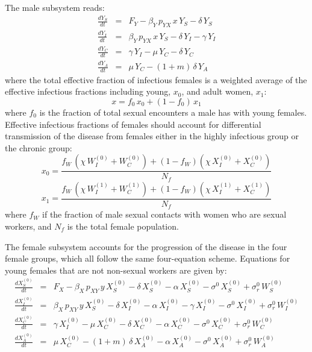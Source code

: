 \documentclass[preprint,12pt]{elsarticle}
\begin{document}
The male subsystem reads:
\begin{eqnarray}
\frac{dY_S}{dt} & = & F_Y - \beta_Y\,p_{YX}\,x\, Y_S - \delta\,Y_S \nonumber\\
\frac{dY_I}{dt} & = & \beta_Y\,p_{YX}\,x\, Y_S - \delta\,Y_I -\gamma\,Y_I \nonumber\\
\frac{dY_C}{dt} & = & \gamma\,Y_I - \mu\, Y_C  - \delta\,Y_C \nonumber\\
\frac{dY_A}{dt} & = & \mu\, Y_C - (1+m)\,\delta\, Y_A
\label{eq:Y}
\end{eqnarray}
where the total effective fraction of infectious females is a weighted average of the effective infectious fractions including young, $x_0$, and adult women, $x_1$:
\begin{equation}
x = f_0\, x_0 + (1-f_0)\,x_1
\label{eq:x_fraction}
\end{equation}
where $f_0$ is the fraction of total sexual encounters a male has with young females. Effective infectious fractions of females should account for differential transmission of the disease from females either in the highly infectious group or the chronic group:
\begin{equation}
x_0 = \frac{ f_W\,(\chi\,W^{(0)}_I+W^{(0)}_C) + (1-f_W)(\chi\,X^{(0)}_I+X^{(0)}_C) }{N_f}
\label{eq:x0_fraction}
\end{equation}
\begin{equation}
x_1 = \frac{ f_W\,(\chi\,W^{(1)}_I+W^{(1)}_C) + (1-f_W)(\chi\,X^{(1)}_I+X^{(1)}_C) }{N_f}
\label{eq:x1_fraction}    
\end{equation}
where $f_W$ if the fraction of male sexual contacts with women who are sexual workers, and $N_f$ is the total female population. 
\smallskip

The female subsystem accounts for the progression of the disease in the four female groups, which all follow the same four-equation scheme. Equations for young females that are not non-sexual workers are given by:
\begin{eqnarray}
\frac{dX^{(0)}_S}{dt} & = & F_X - \beta_X\,p_{XY}\,y\, X^{(0)}_S - \delta\,X^{(0)}_S -\alpha \, X^{(0)}_S - \sigma^0\,X^{(0)}_S + \sigma^0_r\,W^{(0)}_S\nonumber\\
\frac{dX^{(0)}_I}{dt} & = & \beta_X\,p_{XY}\,y\, X^{(0)}_S - \delta\,X^{(0)}_I -\alpha \, X^{(0)}_I - \gamma\,X^{(0)}_I -\sigma^0\,X^{(0)}_I + \sigma^0_r\,W^{(0)}_I\nonumber\\
\frac{dX^{(0)}_C}{dt} & = & \gamma\,X^{(0)}_I - \mu\, X^{(0)}_C  - \delta\,X^{(0)}_C -\alpha \, X^{(0)}_C - \sigma^0\,X^{(0)}_C + \sigma^0_r\,W^{(0)}_C\nonumber\\
\frac{dX^{(0)}_A}{dt} & = & \mu\, X^{(0)}_C - (1+m)\,\delta\, X^{(0)}_A -\alpha \, X^{(0)}_A - \sigma^0\,X^{(0)}_A + \sigma^0_r\,W^{(0)}_A
\label{eq:X_0}
\end{eqnarray}
\smallskip
\end{document}

